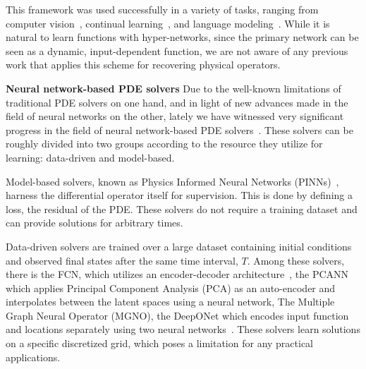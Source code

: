 \documentclass{article}
\theoremstyle{plain}
\theoremstyle{definition}
\theoremstyle{remark}
\begin{document}
This framework was used successfully in a variety of tasks, ranging from computer vision~\citep{littwin2019deep}, continual learning~\citep{Oswald2020Continual},  and language modeling~\citep{suarez2017language}. While it is natural to learn functions with hyper-networks, since the primary network can be seen as a dynamic, input-dependent function, we are not aware of any previous work that applies this scheme for recovering physical operators.

{\bf Neural network-based PDE solvers \quad}
Due to the well-known limitations of traditional PDE solvers on one hand, and in light of new advances made in the field of neural networks on the other, lately we have witnessed very significant progress in the field of neural network-based PDE solvers~\citep{karniadakis2021physics}.
These solvers can be roughly divided into two groups according to the resource they utilize for learning: data-driven and model-based.

Model-based solvers, known as Physics Informed Neural Networks (PINNs)~\citep{raissi2019physics}, harness the differential operator itself for supervision. This is done by defining a loss, the residual of the PDE. These solvers do not require a training dataset and can provide solutions for arbitrary times.

Data-driven solvers are trained over a large dataset containing initial conditions and observed final states after the same time interval, $T$. Among these solvers, there is the FCN, which utilizes an encoder-decoder architecture~\citep{zhu2018bayesian}, the PCANN~\citep{bhattacharya2020model} which applies Principal Component Analysis (PCA) as an auto-encoder and interpolates between the latent spaces using a neural network, The Multiple Graph Neural Operator (MGNO), the DeepONet which encodes input function and locations separately using two neural networks~\citep{LuLu2019DLno}. These solvers learn solutions on a specific discretized grid, which poses a limitation for any practical applications.
\end{document}
